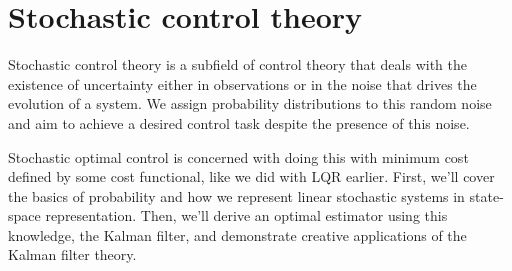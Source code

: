 
\chapter{Stochastic control theory}

Stochastic control theory is a subfield of control theory that deals with the
existence of uncertainty either in observations or in the noise that drives the
evolution of a system. We assign probability distributions to this random noise
and aim to achieve a desired control task despite the presence of this noise.

Stochastic optimal control is concerned with doing this with minimum cost
defined by some cost functional, like we did with LQR earlier. First, we'll
cover the basics of probability and how we represent linear stochastic systems
in state-space representation. Then, we'll derive an optimal estimator using
this knowledge, the Kalman filter, and demonstrate creative applications of the
Kalman filter theory.





